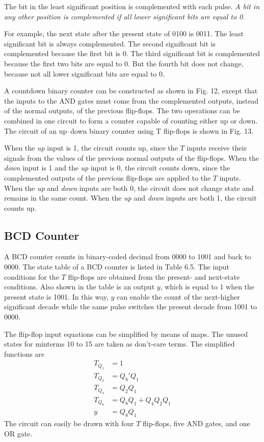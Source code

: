 The bit in the least significant position is complemented with each pulse. \textit{A bit in any other position is complemented if all lower significant bits are equal to 0}.

For example, the next state after the present state of 0100 is 0011. The least significant bit is always complemented. The second significant bit 
is complemented because the first bit is 0. The third significant bit is complemented because the first two bits are equal to 0. But the fourth bit does not change, because not all lower significant bits are equal to 0.

A countdown binary counter can be constructed as shown in Fig. 12, except that the inputs to the AND gates must come from the complemented outputs, instead of the normal outputs, of the previous flip-flops. The two operations can be combined in one circuit to form a counter capable of counting either up or down. The circuit of an up–down binary counter using T flip-flops is shown in Fig. 13.

When the \textit{up} input is 1, the circuit counts up, since the $T$ inputs receive their signals from the values of the previous normal outputs of the flip-flops. When the \textit{down} input is 1 and the \textit{up} input is 0, the circuit counts down, since the complemented outputs of the previous flip-flops are applied to the $T$ inputs. When the \textit{up} and \textit{down} inputs are both 0, the circuit does not change state and remains in the same count. When the \textit{up} and \textit{down} inputs are both 1, the circuit counts up.

\subsection{BCD Counter}
\label{subsec:bcd-counter}

A BCD counter counts in binary-coded decimal from 0000 to 1001 and back to 0000. The state table of a BCD counter is listed in Table 6.5. The input conditions for the $T$ flip-flops are obtained from the present- and next-state conditions. Also shown in the table is an output $y$, which is equal to 1 when the present state is 1001. In this way, $y$ can enable the count of the next-higher significant decade while the same pulse switches 
the present decade from 1001 to 0000.

The flip-flop input equations can be simplified by means of maps. The unused states for minterms 10 to 15 are taken as don't-care terms. The simplified functions are
\begin{align*}
  T_{Q_1} &= 1\\
  T_{Q_2} &= Q_8'Q_1\\
  T_{Q_4} &= Q_2Q_1\\
  T_{Q_8} &= Q_8Q_1 + Q_4Q_2Q_1\\
  y &= Q_8Q_1
\end{align*}
The circuit can easily be drawn with four $T$ flip-flops, five AND gates, and one OR gate.

